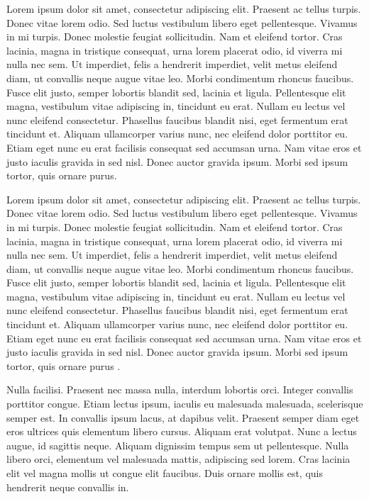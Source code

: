 \documentclass[msc, classic, a4paper]{ufbathesis}
\begin{document}
Lorem ipsum dolor sit amet, consectetur adipiscing elit. Praesent ac tellus turpis. Donec vitae lorem odio. Sed luctus vestibulum libero eget pellentesque. Vivamus in mi turpis. Donec molestie feugiat sollicitudin. Nam et eleifend tortor. Cras lacinia, magna in tristique consequat, urna lorem placerat odio, id viverra mi nulla nec sem. Ut imperdiet, felis a hendrerit imperdiet, velit metus eleifend diam, ut convallis neque augue vitae leo. Morbi condimentum rhoncus faucibus. Fusce elit justo, semper lobortis blandit sed, lacinia et ligula. Pellentesque elit magna, vestibulum vitae adipiscing in, tincidunt eu erat. Nullam eu lectus vel nunc eleifend consectetur. Phasellus faucibus blandit nisi, eget fermentum erat tincidunt et. Aliquam ullamcorper varius nunc, nec eleifend dolor porttitor eu. Etiam eget nunc eu erat facilisis consequat sed accumsan urna. Nam vitae eros et justo iaculis gravida in sed nisl. Donec auctor gravida ipsum. Morbi sed ipsum tortor, quis ornare purus.



Lorem ipsum dolor sit amet, consectetur adipiscing elit. Praesent ac tellus turpis. Donec vitae lorem odio. Sed luctus vestibulum libero eget pellentesque. Vivamus in mi turpis. Donec molestie feugiat sollicitudin. Nam et eleifend tortor. Cras lacinia, magna in tristique consequat, urna lorem placerat odio, id viverra mi nulla nec sem. Ut imperdiet, felis a hendrerit imperdiet, velit metus eleifend diam, ut convallis neque augue vitae leo. Morbi condimentum rhoncus faucibus. Fusce elit justo, semper lobortis blandit sed, lacinia et ligula. Pellentesque elit magna, vestibulum vitae adipiscing in, tincidunt eu erat. Nullam eu lectus vel nunc eleifend consectetur. Phasellus faucibus blandit nisi, eget fermentum erat tincidunt et. Aliquam ullamcorper varius nunc, nec eleifend dolor porttitor eu. Etiam eget nunc eu erat facilisis consequat sed accumsan urna. Nam vitae eros et justo iaculis gravida in sed nisl. Donec auctor gravida ipsum. Morbi sed ipsum tortor, quis ornare purus \cite{demeyer2008}.

Nulla facilisi. Praesent nec massa nulla, interdum lobortis orci. Integer convallis porttitor congue. Etiam lectus ipsum, iaculis eu malesuada malesuada, scelerisque semper est. In convallis ipsum lacus, at dapibus velit. Praesent semper diam eget eros ultrices quis elementum libero cursus. Aliquam erat volutpat. Nunc a lectus augue, id sagittis neque. Aliquam dignissim tempus sem ut pellentesque. Nulla libero orci, elementum vel malesuada mattis, adipiscing sed lorem. Cras lacinia elit vel magna mollis ut congue elit faucibus. Duis ornare mollis est, quis hendrerit neque convallis in.
\end{document}
